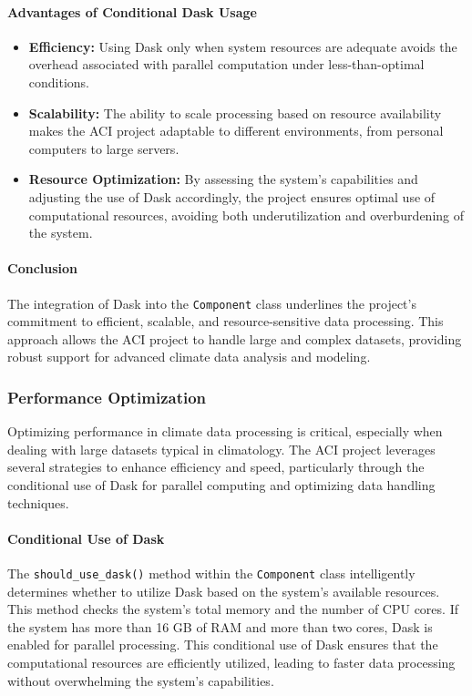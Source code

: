 \documentclass[a4paper,12pt]{article}
\begin{document}
\paragraph{Advantages of Conditional Dask Usage}
\begin{itemize}
    \item \textbf{Efficiency:} Using Dask only when system resources are adequate avoids the overhead associated with parallel computation under less-than-optimal conditions.
    \item \textbf{Scalability:} The ability to scale processing based on resource availability makes the ACI project adaptable to different environments, from personal computers to large servers.
    \item \textbf{Resource Optimization:} By assessing the system's capabilities and adjusting the use of Dask accordingly, the project ensures optimal use of computational resources, avoiding both underutilization and overburdening of the system.
\end{itemize}

\paragraph{Conclusion}
The integration of Dask into the \texttt{Component} class underlines the project's commitment to efficient, scalable, and resource-sensitive data processing. This approach allows the ACI project to handle large and complex datasets, providing robust support for advanced climate data analysis and modeling.

\subsubsection{Performance Optimization}
Optimizing performance in climate data processing is critical, especially when dealing with large datasets typical in climatology. The ACI project leverages several strategies to enhance efficiency and speed, particularly through the conditional use of Dask for parallel computing and optimizing data handling techniques.

\paragraph{Conditional Use of Dask}
The \texttt{should\_use\_dask()} method within the \texttt{Component} class intelligently determines whether to utilize Dask based on the system's available resources. This method checks the system's total memory and the number of CPU cores. If the system has more than 16 GB of RAM and more than two cores, Dask is enabled for parallel processing. This conditional use of Dask ensures that the computational resources are efficiently utilized, leading to faster data processing without overwhelming the system's capabilities.
\end{document}
